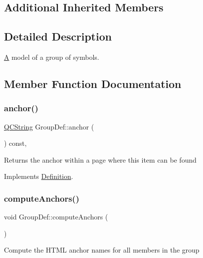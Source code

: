 \subsection*{Additional Inherited Members}


\subsection{Detailed Description}
\mbox{\hyperlink{class_a}{A}} model of a group of symbols. 

\subsection{Member Function Documentation}
\mbox{\label{class_group_def_a924c6e5a6fe495d70383ddc751704095}} 
\subsubsection{\texorpdfstring{anchor()}{anchor()}}
{\footnotesize\ttfamily \mbox{\hyperlink{class_q_c_string}{Q\+C\+String}} Group\+Def\+::anchor (\begin{DoxyParamCaption}{ }\end{DoxyParamCaption}) const\hspace{0.3cm}{\ttfamily [inline]}, {\ttfamily [virtual]}}

Returns the anchor within a page where this item can be found 

Implements \mbox{\hyperlink{class_definition_a56e91f9b76f41208a22cfb2336871604}{Definition}}.

\mbox{\label{class_group_def_a2b3099f398ccdb867feab801bcb970cd}} 
\subsubsection{\texorpdfstring{computeAnchors()}{computeAnchors()}}
{\footnotesize\ttfamily void Group\+Def\+::compute\+Anchors (\begin{DoxyParamCaption}{ }\end{DoxyParamCaption})}

Compute the H\+T\+ML anchor names for all members in the group \mbox{\label{class_group_def_a1b6b622a9adaeb6b2845945ccb1ddd93}} 
